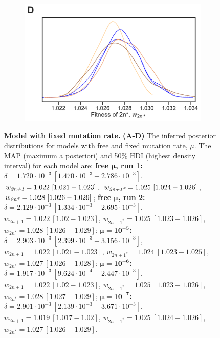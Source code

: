 \documentclass[12pt]{extarticle}
\newcommand{\anwt}{\emph{2n+1}}
\newcommand{\eumt}{\emph{2n*}}
\newcommand{\anmt}{\emph{2n+1*}}
\begin{document}
\begin{figure}[p]
\begin{subfigure}{0.45\textwidth}
  \end{subfigure}
    \begin{subfigure}{0.45\textwidth}
      \includegraphics[width=\textwidth]{../figures/mu-D.pdf}      
    \end{subfigure}
  \caption{
    \textbf{Model with fixed mutation rate.}  \textbf{(A-D)} The inferred posterior distributions for models with free and fixed mutation rate, $\mu$. The MAP (maximum a posteriori) and 50\% HDI (highest density interval) for each model are: %
\textbf{free $\boldsymbol{\mu}$, run 1:}
$\delta=1.720\cdot10^{-3}\ [1.470\cdot10^{-3}-2.786\cdot10^{-3}]$, 
$w_{\anwt}=1.022\ [1.021-1.023]$,
$w_{\anmt}=1.025\ [1.024-1.026]$,
$w_{\eumt}=1.028\ [1.026-1.029]$;
\textbf{free $\boldsymbol{\mu}$, run 2:}
$\delta=2.129\cdot10^{-3}\ [1.334\cdot10^{-3}-2.695\cdot10^{-3}]$,
$w_{2n+1}=1.022\ [1.02-1.023]$,
$w_{2n+1^*}=1.025\ [1.023-1.026]$,
$w_{2n^*}=1.028\ [1.026-1.029]$;
\textbf{$\boldsymbol{\mu=10^{-5}}$:}
$\delta=2.903\cdot10^{-3}\ [2.399\cdot10^{-3}-3.156\cdot10^{-3}]$,
$w_{2n+1}=1.022\ [1.021-1.023]$,
$w_{2n+1^*}=1.024\ [1.023-1.025]$,
$w_{2n^*}=1.027\ [1.026-1.028]$;
\textbf{$\boldsymbol{\mu=10^{-6}}$:}
$\delta=1.917\cdot10^{-3}\ [9.624\cdot10^{-4}-2.447\cdot10^{-3}]$,
$w_{2n+1}=1.022\ [1.02-1.023]$,
$w_{2n+1^*}=1.025\ [1.023-1.026]$,
$w_{2n^*}=1.028\ [1.027-1.029]$;
\textbf{$\boldsymbol{\mu=10^{-7}}$:}
$\delta=2.901\cdot10^{-3}\ [2.139\cdot10^{-3}-3.671\cdot10^{-3}]$,
$w_{2n+1}=1.019\ [1.017-1.02]$,
$w_{2n+1^*}=1.025\ [1.024-1.026]$,
$w_{2n^*}=1.027\ [1.026-1.029]$.
\label{fig:mu}
  }
\end{figure}
\end{document}
